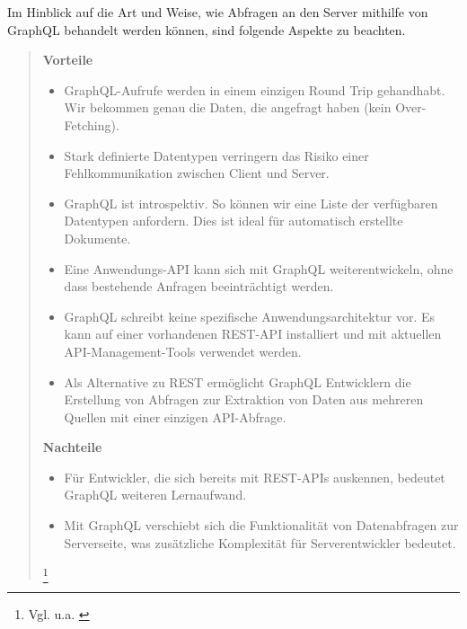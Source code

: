 Im Hinblick auf die Art und Weise, wie Abfragen an den Server mithilfe von 
\\ GraphQL behandelt werden können, sind folgende Aspekte zu beachten.
\\
\begin{quote}
  \textbf{Vorteile}\\
  \begin{itemize}
    \item
          GraphQL-Aufrufe werden in einem einzigen Round Trip gehandhabt. Wir bekommen genau die Daten, die angefragt haben (kein Over-Fetching).

    \item
          Stark definierte Datentypen verringern das Risiko einer Fehlkommunikation zwischen Client und Server.

    \item
          GraphQL ist introspektiv. So können wir eine Liste der verfügbaren Datentypen anfordern. Dies ist ideal für automatisch erstellte Dokumente.

    \item
          Eine Anwendungs-API kann sich mit GraphQL weiterentwickeln, ohne dass bestehende Anfragen beeinträchtigt werden.
    \item
          GraphQL schreibt keine spezifische Anwendungsarchitektur vor. Es kann auf einer vorhandenen REST-API installiert und mit aktuellen API-Management-Tools verwendet werden.
    \item
          Als Alternative zu REST ermöglicht GraphQL Entwicklern die Erstellung von Abfragen zur Extraktion von Daten aus mehreren Quellen mit einer einzigen API-Abfrage.

  \end{itemize}

  \textbf{Nachteile}
  \begin{itemize}
    \item
          Für Entwickler, die sich bereits mit REST-APIs auskennen, bedeutet GraphQL weiteren Lernaufwand.
    \item
          Mit GraphQL verschiebt sich die Funktionalität von Datenabfragen zur Serverseite, was zusätzliche Komplexität für Serverentwickler bedeutet.

  \end{itemize}

  \footnote{Vgl. u.a. \cite{RH1}}
\end{quote}

